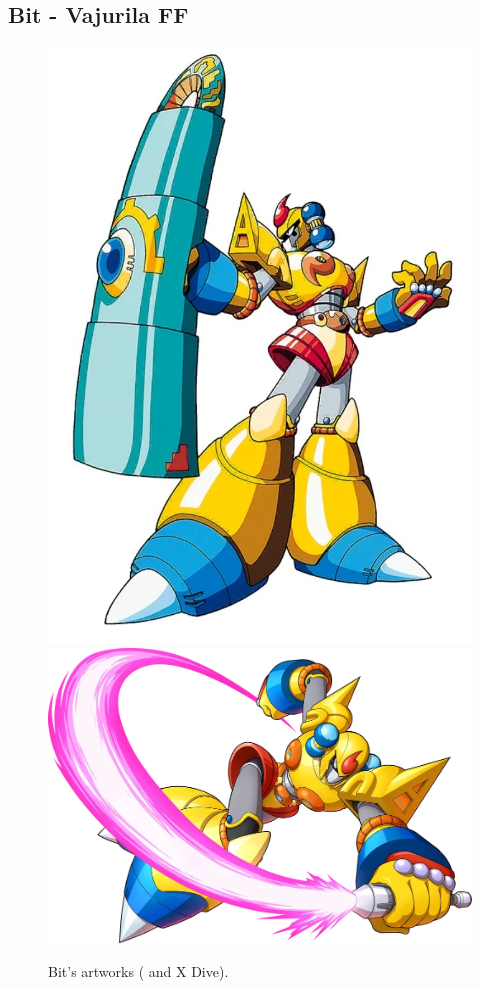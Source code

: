 \subsection{Bit - Vajurila FF}\label{boss:Bit}
\begin{figure}[htp]
	\centering
	\includegraphics[height=\portraitsize]{figures/X3/Enemies/bit.png}
	\includegraphics[height=\portraitsize]{figures/X3/Enemies/XBit.png}
	\caption{Bit's artworks (\cite{book:MMX_Complete_art} and X Dive).}
\end{figure}
